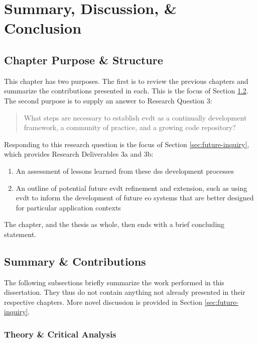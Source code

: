 \chapter{Summary, Discussion, \& Conclusion} \label{ch:conclusion}

\section{Chapter Purpose \& Structure}

This chapter has two purposes. The first is to review the previous chapters and summarize the contributions presented in each. This is the focus of Section \ref{sec:summary}. The second purpose is to supply an answer to Research Question 3:

\blockquote{What steps are necessary to establish \acf{evdt} as a continually development framework, a community of practice, and a growing code repository?}

Responding to this research question is the focus of Section \ref{sec:future-inquiry}, which provides Research Deliverables 3a and 3b:

	\begin{enumerate}[label=\emph{\alph*},itemsep=0pt,parsep=0pt]
		\item{An assessment of lessons learned from these \acf{dss} development processes} 
		\item{An outline of potential future \ac{evdt} refinement and extension, such as using \ac{evdt} to inform the development of future \acf{eo} systems that are better designed for particular application contexts}
	\end{enumerate}
	
The chapter, and the thesis as whole, then ends with a brief concluding statement.

\section{Summary \& Contributions} \label{sec:summary}

The following subsections briefly summarize the work performed in this dissertation. They thus do not contain anything not already presented in their respective chapters. More novel discussion is provided in Section \ref{sec:future-inquiry}.

\subsection{Theory \& Critical Analysis}

